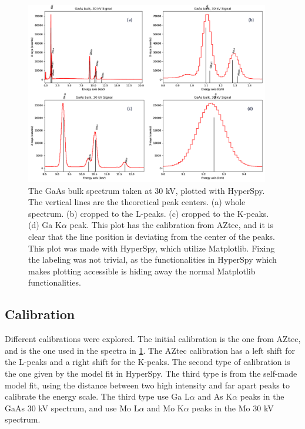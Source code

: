 \begin{figure}[p]
    \centering
    \includegraphics[width=0.95\textwidth]{figures/GaAs30kV_HS.png}
    \caption{
        The GaAs bulk spectrum taken at 30 kV, plotted with HyperSpy.
        The vertical lines are the theoretical peak centers.%
        (a) whole spectrum.
        (b) cropped to the L-peaks.
        (c) cropped to the K-peaks.
        (d) Ga K$\alpha$ peak.
        This plot has the calibration from AZtec, and it is clear that the line position is deviating from the center of the peaks.
        This plot was made with HyperSpy, which utilize Matplotlib.
        Fixing the labeling was not trivial, as the functionalities in HyperSpy which makes plotting accessible is hiding away the normal Matplotlib functionalities.
    }
    \label{fig:GaAs30kV_HS}
\end{figure}






\subsection{Calibration}
\label{sec:results:qualitative:calibration}

Different calibrations were explored.
The initial calibration is the one from AZtec, and is the one used in the spectra in \cref{fig:GaAs30kV_HS}.
The AZtec calibration has a left shift for the L-peaks and a right shift for the K-peaks.
The second type of calibration is the one given by the model fit in HyperSpy.
The third type is from the self-made model fit, using the distance between two high intensity and far apart peaks to calibrate the energy scale.
The third type use Ga L$\alpha$ and As K$\alpha$ peaks in the GaAs 30 kV spectrum, and use Mo L$\alpha$ and Mo K$\alpha$ peaks in the Mo 30 kV spectrum.

